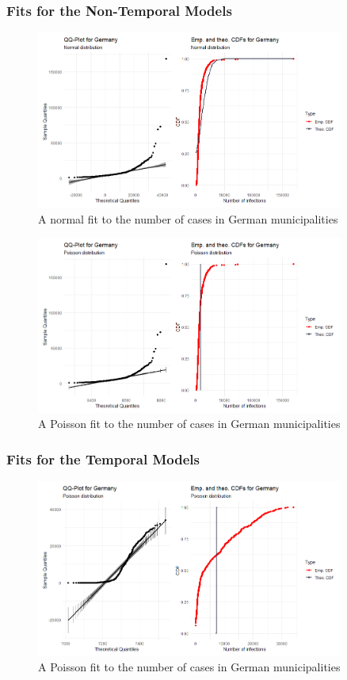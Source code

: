 \subsubsection{Fits for the Non-Temporal Models}
\begin{figure}[H]
    \centering
    \includegraphics[width = 0.9\textwidth]{fit_normal_germany.png}
    \caption{A normal fit to the number of cases in German municipalities}
    \label{fitNormalGermany}
\end{figure}
\begin{figure}[H]
    \centering
    \includegraphics[width = 0.9\textwidth]{fit_poisson_germany.png}
    \caption{A Poisson fit to the number of cases in German municipalities}
    \label{fitPoissonGermany}
\end{figure}
\clearpage
\subsubsection{Fits for the Temporal Models}\label{sec:temp_fit_germany}
\begin{figure}[H]
  \centering
  \includegraphics[width = 0.9\textwidth]{fit_poisson_germany_ts.png}
  \caption{A Poisson fit to the number of cases in German municipalities}
  \label{fitPoissonGermany_ts}
\end{figure}
